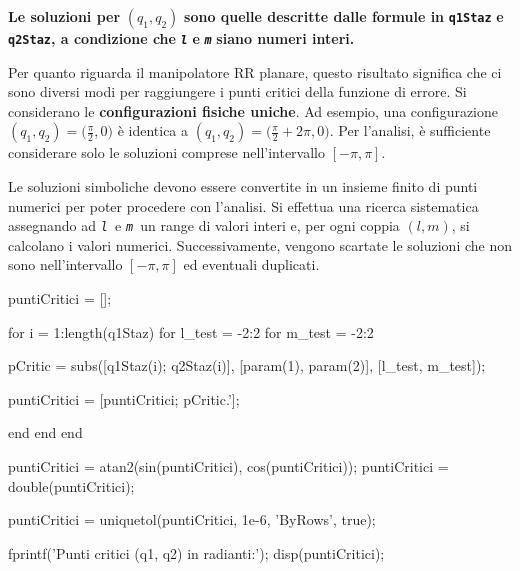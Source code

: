 \documentclass[11pt, a4paper]{article}
\begin{document}
\begin{par}
\begin{flushleft}
\textbf{Le soluzioni per }$(q_1 ,q_2 )$\textbf{ sono quelle descritte dalle formule in }\texttt{\textbf{q1Staz}}\textbf{ e }\texttt{\textbf{q2Staz}}\textbf{, a condizione che }\texttt{\textit{\textbf{l}}}\textit{\textbf{ }}\textbf{e}\textit{\textbf{ }}\texttt{\textit{\textbf{m}}}\textbf{ siano numeri interi.}
\end{flushleft}
\end{par}

\begin{par}
\begin{flushleft}
Per quanto riguarda il manipolatore RR planare, questo risultato significa che ci sono diversi modi per raggiungere i punti critici della funzione di errore. Si considerano le \textbf{configurazioni fisiche uniche}. Ad esempio, una configurazione $(q_1 ,q_2 )=\biggl(\frac{\pi }{2},0\biggr)$ è identica a $(q_1 ,q_2 )=\biggl(\frac{\pi }{2}+2\pi ,0\biggr)$. Per l'analisi, è sufficiente considerare solo le soluzioni comprese nell'intervallo $[-\pi ,\pi ]$.
\end{flushleft}
\end{par}

\begin{par}
\begin{flushleft}
Le soluzioni simboliche devono essere convertite in un insieme finito di punti numerici per poter procedere con l'analisi. Si effettua una ricerca sistematica assegnando ad \texttt{\textit{l }}e \texttt{\textit{m}}\texttt{ }un range di valori interi e, per ogni coppia $(l,m)$, si calcolano i valori numerici. Successivamente, vengono scartate le soluzioni che non sono nell'intervallo $[-\pi ,\pi ]$ ed eventuali duplicati.
\end{flushleft}
\end{par}

\begin{matlabcode}
puntiCritici = [];

for i = 1:length(q1Staz)
    for l_test = -2:2
        for m_test = -2:2

            pCritic = subs([q1Staz(i); q2Staz(i)], [param(1), param(2)], [l_test, m_test]);

            puntiCritici = [puntiCritici; pCritic.'];

        end
    end
end

puntiCritici = atan2(sin(puntiCritici), cos(puntiCritici));
puntiCritici = double(puntiCritici);

puntiCritici = uniquetol(puntiCritici, 1e-6, 'ByRows', true);

fprintf('Punti critici (q1, q2) in radianti:\n');
disp(puntiCritici);
\end{matlabcode}
\end{document}
